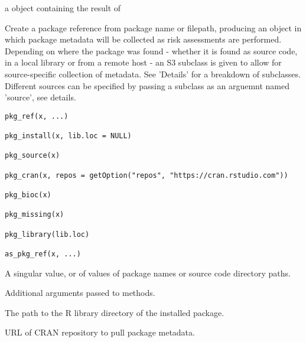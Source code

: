 \documentclass[a4paper]{book}
\begin{document}
%
\begin{Value}
a  object containing the result of 
\end{Value}
%
\begin{Description}
Create a package reference from package name or filepath, producing an object
in which package metadata will be collected as risk assessments are
performed. Depending on where the package was found - whether it is found as
source code, in a local library or from a remote host - an S3 subclass is
given to allow for source-specific collection of metadata. See 'Details' for
a breakdown of subclasses. Different sources can be specified by passing a
subclass as an arguemnt named 'source', see details.
\end{Description}
%
\begin{Usage}
\begin{verbatim}
pkg_ref(x, ...)

pkg_install(x, lib.loc = NULL)

pkg_source(x)

pkg_cran(x, repos = getOption("repos", "https://cran.rstudio.com"))

pkg_bioc(x)

pkg_missing(x)

pkg_library(lib.loc)

as_pkg_ref(x, ...)
\end{verbatim}
\end{Usage}
%
\begin{Arguments}
\begin{ldescription}
\item[\code{x}] A singular  value,  or
 of  values of package names or source code
directory paths.

\item[\code{...}] Additional arguments passed to methods.

\item[\code{lib.loc}] The path to the R library directory of the installed package.

\item[\code{repos}] URL of CRAN repository to pull package metadata.
\end{ldescription}
\end{Arguments}
\end{document}
